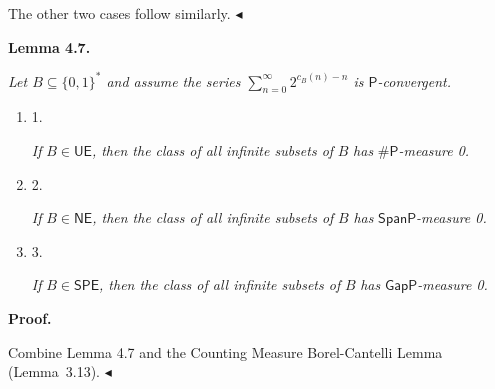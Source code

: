 The other two cases follow similarly.
$\blacktriangleleft$\par





\par\medskip\noindent\textbf{
\textbf{Lemma 4.7}\textbf{.}
}\par



\emph{Let $B\subseteq\{0,1\}^{*}$ and assume the series $\sum\limits_{n=0}^{\infty}2^{c_{B}(n)-n}$ is $\mathsf{P}$-convergent.}\par


\begin{enumerate}


\item[] 
1. 


\emph{If }$B\in\mathsf{UE}$\emph{, then
the class of all infinite subsets of }$B$\emph{ has }${\mathsf{\#}\mathsf{P}}$\emph{-measure 0.}\par





\item[] 
2. 


\emph{If }$B\in\mathsf{NE}$\emph{, then
the class of all infinite subsets of }$B$\emph{ has }$\mathsf{SpanP}$\emph{-measure 0.}\par





\item[] 
3. 


\emph{If }$B\in\mathsf{SPE}$\emph{, then
the class of all infinite subsets of }$B$\emph{ has }$\mathsf{GapP}$\emph{-measure 0.}\par





\end{enumerate}







\par\medskip\noindent\textbf{Proof.}\par




Combine Lemma 4.7 and the Counting Measure Borel-Cantelli Lemma (Lemma 3.13).
$\blacktriangleleft$\par



